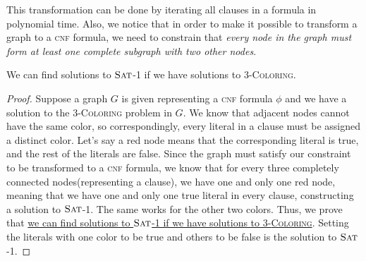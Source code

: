     This transformation can be done by iterating all clauses in a formula in polynomial time.
    Also, we notice that in order to make it possible to transform a graph to a \textsc{cnf} formula, we need to constrain that 
    \emph{every node in the graph must form at least one complete subgraph with two other nodes}. 

    \begin{theo}
        We can find solutions to $\textsc{Sat}$-1 if we have solutions to 3-\textsc{Coloring}.
    \end{theo}
    \begin{proof}
        Suppose a graph $G$ is given representing a \textsc{cnf} formula $\phi$ and we have a solution to the 3-\textsc{Coloring} 
        problem in $G$. We know that adjacent nodes cannot have the same color, so correspondingly, every literal in a clause 
        must be assigned a distinct color. Let's say a red node means that the corresponding literal is true, and the rest of the 
        literals are false. Since the graph must satisfy our constraint to be transformed to a \textsc{cnf} formula, 
        we know that for every three completely connected nodes(representing a clause), we have one and only one red node, meaning 
        that we have one and only one true literal in every clause, constructing a solution to $\textsc{Sat}$-1. The same works for the 
        other two colors. Thus, we prove that \underline{we can find solutions to $\textsc{Sat}$-1 if we have solutions to 3-\textsc{Coloring}}. 
        Setting the literals with one color to be true and others to be false is the solution to $\textsc{Sat}$-1.
    \end{proof}

